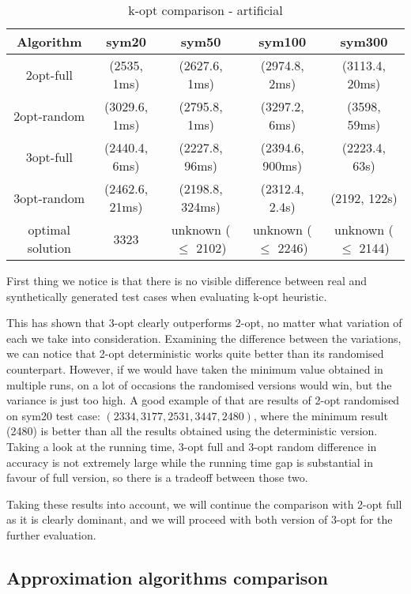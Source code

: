 \documentclass[12pt,twoside,notitlepage]{report}
\begin{document}
\begin{table}[h!]
\centering
\begin{tabular}{||c || c | c | c | c||} 
 \hline
 Algorithm & sym20 & sym50 & sym100 & sym300 \\ [0.5ex] 
 \hline\hline
 2opt-full & (2535, 1ms) & (2627.6, 1ms) & (2974.8, 2ms) & (3113.4, 20ms) \\
 2opt-random & (3029.6, 1ms) & (2795.8, 1ms) & (3297.2, 6ms) & (3598, 59ms) \\
 3opt-full & (2440.4, 6ms) & (2227.8, 96ms) & (2394.6, 900ms) & (2223.4, 63s) \\
 3opt-random & (2462.6, 21ms) & (2198.8, 324ms) & (2312.4, 2.4s) & (2192, 122s) \\
 \hline\hline
 optimal solution & 3323 & unknown ($\leq$ 2102) & unknown ($\leq$ 2246) & unknown ($\leq$ 2144)\\
 \hline
\end{tabular}
\caption{k-opt comparison - artificial}
\label{comparison:3}
\end{table}

First thing we notice is that there is no visible difference between real and synthetically generated test cases when evaluating k-opt heuristic.

This has shown that 3-opt clearly outperforms 2-opt, no matter what variation of each we take into consideration. Examining the difference between the variations, we can notice that 2-opt deterministic works quite better than its randomised counterpart. However, if we would have taken the minimum value obtained in multiple runs, on a lot of occasions the randomised versions would win, but the variance is just too high. A good example of that are results of 2-opt randomised on sym20 test case: $(2334, 3177, 2531, 3447, 2480)$, where the minimum result (2480) is better than all the results obtained using the deterministic version. Taking a look at the running time, 3-opt full and 3-opt random difference in accuracy is not extremely large while the running time gap is substantial in favour of full version, so there is a tradeoff between those two.

Taking these results into account, we will continue the comparison with 2-opt full as it is clearly dominant, and we will proceed with both version of 3-opt for the further evaluation.

\subsection{Approximation algorithms comparison}
\end{document}
